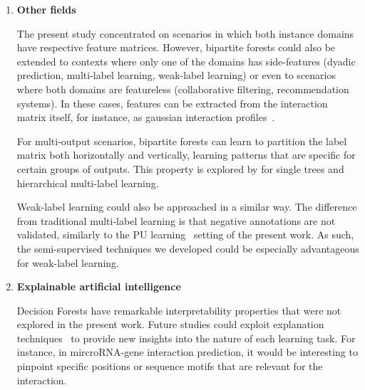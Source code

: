 \begin{enumerate}
    \item \textbf{Other fields}

    The present study concentrated on scenarios in which both instance domains have respective feature matrices. However, bipartite forests could also be extended to contexts where only one of the domains has side-features (dyadic prediction, multi-label learning, weak-label learning) or even to scenarios where both domains are featureless (collaborative filtering, recommendation systems).
    In these cases, features can be extracted from the interaction matrix itself, for instance, as gaussian interaction profiles~\cite{vanlaarhoven2011gaussian}.

    For multi-output scenarios, bipartite forests 
    can learn to partition the label matrix both horizontally and vertically, learning patterns that are specific for certain groups of outputs. This property is explored by \cite{zaminth} for single trees and hierarchical multi-label learning.

    Weak-label learning could also be approached in a similar way. The difference from traditional multi-label learning is that negative annotations are not validated, similarly to the PU learning~\cite{bekker2020learning} setting of the present work. As such, the semi-supervised techniques we developed could be especially advantageous for weak-label learning.

    \item \textbf{Explainable artificial intelligence}

    Decision Forests have remarkable interpretability properties that were not explored in the present work. Future studies could exploit explanation techniques~\cite{mdi, mdi+, treeshap} to provide new insights into the nature of each learning task.
    For instance, in mircroRNA-gene interaction prediction, it would be interesting to pinpoint specific positions or sequence motifs that are relevant for the interaction.

\end{enumerate}
